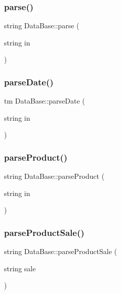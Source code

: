 \subsubsection{\texorpdfstring{parse()}{parse()}}
{\footnotesize\ttfamily string Data\+Base\+::parse (\begin{DoxyParamCaption}\item[{string}]{in }\end{DoxyParamCaption})}

\mbox{\label{classDataBase_aa63ea6b1a96135acd1839ae9a0983d3f}} 
\subsubsection{\texorpdfstring{parse\+Date()}{parseDate()}}
{\footnotesize\ttfamily tm Data\+Base\+::parse\+Date (\begin{DoxyParamCaption}\item[{string}]{in }\end{DoxyParamCaption})}

\mbox{\label{classDataBase_ab0744d4be63a6db44fdcf21c22d61914}} 
\subsubsection{\texorpdfstring{parse\+Product()}{parseProduct()}}
{\footnotesize\ttfamily string Data\+Base\+::parse\+Product (\begin{DoxyParamCaption}\item[{string}]{in }\end{DoxyParamCaption})}

\mbox{\label{classDataBase_a5310a888c5c94fc87135b5cf8b9267f5}} 
\subsubsection{\texorpdfstring{parse\+Product\+Sale()}{parseProductSale()}}
{\footnotesize\ttfamily string Data\+Base\+::parse\+Product\+Sale (\begin{DoxyParamCaption}\item[{string}]{sale }\end{DoxyParamCaption})}

